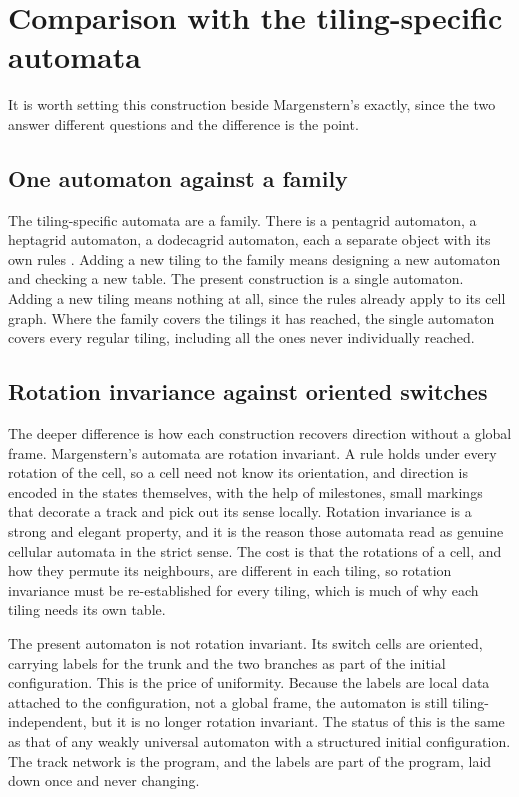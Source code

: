 \section{Comparison with the tiling-specific automata}
\label{sec:comparison}

It is worth setting this construction beside Margenstern's exactly, since the two answer different questions and
the difference is the point.

\subsection{One automaton against a family}

The tiling-specific automata are a family. There is a pentagrid automaton, a heptagrid automaton, a dodecagrid
automaton, each a separate object with its own rules \cite{margenstern2014penta5, margenstern2009hepta,
margenstern2021dodeca5}. Adding a new tiling to the family means designing a new automaton and checking a new
table. The present construction is a single automaton. Adding a new tiling means nothing at all, since the
rules already apply to its cell graph. Where the family covers the tilings it has reached, the single automaton
covers every regular tiling, including all the ones never individually reached.

\subsection{Rotation invariance against oriented switches}

The deeper difference is how each construction recovers direction without a global frame. Margenstern's
automata are rotation invariant. A rule holds under every rotation of the cell, so a cell need not know its
orientation, and direction is encoded in the states themselves, with the help of milestones, small markings
that decorate a track and pick out its sense locally. Rotation invariance is a strong and elegant property, and
it is the reason those automata read as genuine cellular automata in the strict sense. The cost is that the
rotations of a cell, and how they permute its neighbours, are different in each tiling, so rotation invariance
must be re-established for every tiling, which is much of why each tiling needs its own table.

The present automaton is not rotation invariant. Its switch cells are oriented, carrying labels for the trunk
and the two branches as part of the initial configuration. This is the price of uniformity. Because the labels
are local data attached to the configuration, not a global frame, the automaton is still tiling-independent,
but it is no longer rotation invariant. The status of this is the same as that of any weakly universal
automaton with a structured initial configuration. The track network is the program, and the labels are part
of the program, laid down once and never changing.

